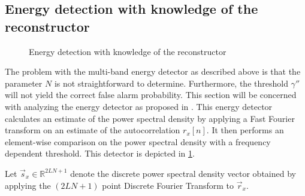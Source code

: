 \documentclass[a4paper, openany, oneside]{memoir}
\begin{document}
\subsection{Energy detection with knowledge of the reconstructor}  
\begin{figure}[H]
\centering
{}
\caption{Energy detection with knowledge of the reconstructor}\label{tkz:ed_ari_overview}
\end{figure}
The problem with the multi-band energy detector as described above is that the parameter $N$ is not straightforward to determine. Furthermore, the threshold $\gamma''$ will not yield the correct false alarm probability. This section will be concerned with analyzing the energy detector as proposed in \cite{ariananda2012compressive}. This energy detector calculates an estimate of the power spectral density by applying a Fast Fourier transform on an estimate of the autocorrelation $r_x[n]$. It then performs an element-wise comparison on the power spectral density with a frequency dependent threshold. This detector is depicted in \cref{tkz:ed_ari_overview}.

Let $\vec{s}_x \in \mathbb{R}^{2LN+1}$ denote the discrete power spectral density vector obtained by applying the $(2LN+1)$ point Discrete Fourier Transform to $\vec{r}_x$. 
\end{document}
